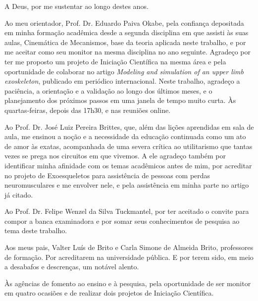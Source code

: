 

\begingroup\setlength{\parskip}{\medskipamount}
A Deus, por me sustentar ao longo destes anos.

Ao meu orientador, Prof. Dr. Eduardo Paiva Okabe, pela confiança depositada em minha formação acadêmica desde a segunda disciplina em que assisti às suas aulas, Cinemática de Mecanismos, base da teoria aplicada neste trabalho, e por me aceitar como seu monitor na mesma disciplina no ano seguinte. Agradeço por ter me proposto um projeto de Iniciação Científica na mesma área e pela oportunidade de colaborar no artigo \textit{Modeling and simulation of an upper limb exoskeleton}, publicado em periódico internacional. Neste trabalho, agradeço a paciência, a orientação e a validação ao longo dos últimos meses, e o planejamento dos próximos passos em uma janela de tempo muito curta. Às quartas-feiras, depois das 17h30, e nas reuniões online.

Ao Prof. Dr. José Luiz Pereira Brittes, que, além das lições aprendidas em sala de aula, me ensinou a noção e a necessidade da educação continuada como um ato de amor às exatas, acompanhada de uma severa crítica ao utilitarismo que tantas vezes se prega nos circuitos em que vivemos. A ele agradeço também por identificar minha afinidade com os temas acadêmicos antes de mim, por acreditar no projeto de Exoesqueletos para assistência de pessoas com perdas neuromusculares e me envolver nele, e pela assistência em minha parte no artigo já citado.

Ao Prof. Dr. Felipe Wenzel da Silva Tuckmantel, por ter aceitado o convite para compor a banca examinadora e por somar seus conhecimentos de pesquisa ao tema deste trabalho.

Aos meus pais, Valter Luís de Brito e Carla Simone de Almeida Brito, professores de formação. Por acreditarem na universidade pública. E por terem sido, em meio a desabafos e descrenças, um notável alento.

Às agências de fomento ao ensino e à pesquisa, pela oportunidade de ser monitor em quatro ocasiões e de realizar dois projetos de Iniciação Científica.

